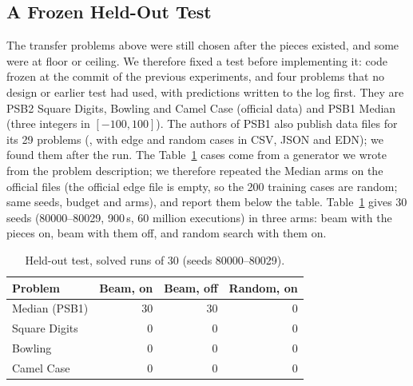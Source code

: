 \documentclass[sigconf,nonacm]{acmart}
\begin{document}
\subsection{A Frozen Held-Out Test}
\label{sec:heldout}
The transfer problems above were still chosen after the pieces existed, and some were at floor or ceiling. We therefore fixed a test before implementing it: code frozen at the commit of the previous experiments, and four problems that no design or earlier test had used, with predictions written to the log first. They are PSB2 Square Digits, Bowling and Camel Case (official data) and PSB1 Median (three integers in $[-100,100]$). The authors of PSB1 also publish data files for its 29 problems (, with edge and random cases in CSV, JSON and EDN); we found them after the run. The Table~\ref{tab:heldout} cases come from a generator we wrote from the problem description; we therefore repeated the Median arms on the official files (the official edge file is empty, so the 200 training cases are random; same seeds, budget and arms), and report them below the table. Table~\ref{tab:heldout} gives 30 seeds (80000--80029, 900\,s, 60 million executions) in three arms: beam with the pieces on, beam with them off, and random search with them on.

\begin{table}[t]
  \caption{Held-out test, solved runs of 30 (seeds 80000--80029).}
  \label{tab:heldout}
  \begin{tabular}{lrrr}
    \toprule
    Problem & Beam, on & Beam, off & Random, on \\
    \midrule
    Median (PSB1) & 30 & 30 & 0 \\
    Square Digits & 0 & 0 & 0 \\
    Bowling & 0 & 0 & 0 \\
    Camel Case & 0 & 0 & 0 \\
    \bottomrule
  \end{tabular}
\end{table}
\end{document}
